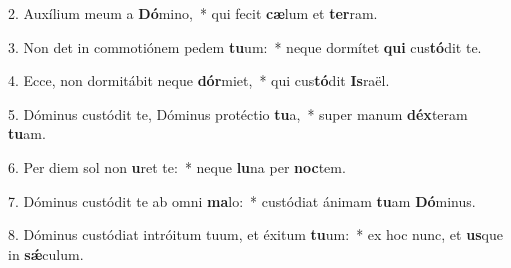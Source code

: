 2. Auxílium meum a \textbf{Dó}mino,~*  qui fecit \textbf{cæ}lum et \textbf{ter}ram.\

3. Non det in commotiónem pedem \textbf{tu}um:~*  neque dormítet \textbf{qui} cus\textbf{tó}dit te.\

4. Ecce, non dormitábit neque \textbf{dór}miet,~*  qui cus\textbf{tó}dit \textbf{Is}raël.\

5. Dóminus custódit te, Dóminus protéctio \textbf{tu}a,~*  super manum \textbf{déx}teram \textbf{tu}am.\

6. Per diem sol non \textbf{u}ret te:~*  neque \textbf{lu}na per \textbf{noc}tem.\

7. Dóminus custódit te ab omni \textbf{ma}lo:~*  custódiat ánimam \textbf{tu}am \textbf{Dó}minus.\

8. Dóminus custódiat intróitum tuum, et éxitum \textbf{tu}um:~*  ex hoc nunc, et \textbf{us}que in \textbf{sǽ}culum.\

